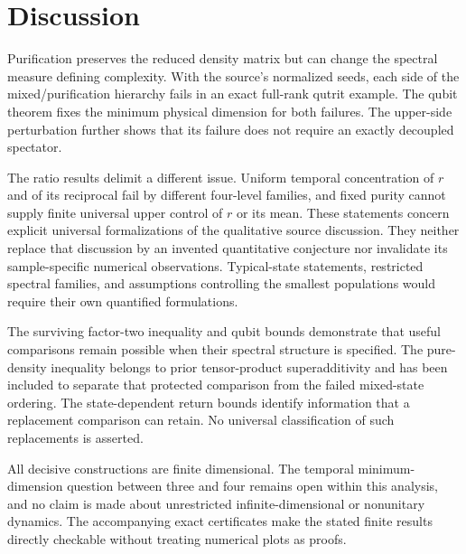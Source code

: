 \section{Discussion}\label{sec:discussion}
Purification preserves the reduced density matrix but can change the
spectral measure defining complexity. With the source's normalized seeds,
each side of the mixed/purification hierarchy fails in an exact full-rank
qutrit example. The qubit theorem fixes the minimum physical dimension
for both failures. The upper-side perturbation further shows that its
failure does not require an exactly decoupled spectator.

The ratio results delimit a different issue. Uniform temporal
concentration of $r$ and of its reciprocal fail by different four-level
families, and fixed purity cannot supply finite universal upper control
of $r$ or its mean. These statements concern explicit universal
formalizations of the qualitative source discussion. They neither replace
that discussion by an invented quantitative conjecture nor invalidate its
sample-specific numerical observations. Typical-state statements,
restricted spectral families, and assumptions controlling the smallest
populations would require their own quantified formulations.

The surviving factor-two inequality and qubit bounds demonstrate that
useful comparisons remain possible when their spectral structure is
specified. The pure-density inequality belongs to prior tensor-product
superadditivity and has been included to separate that protected
comparison from the failed mixed-state ordering. The state-dependent
return bounds identify information that a replacement comparison can
retain. No universal classification of such replacements is asserted.

All decisive constructions are finite dimensional. The temporal
minimum-dimension question between three and four remains open within
this analysis, and no claim is made about unrestricted infinite-dimensional
or nonunitary dynamics. The accompanying exact certificates make the
stated finite results directly checkable without treating numerical plots
as proofs.
